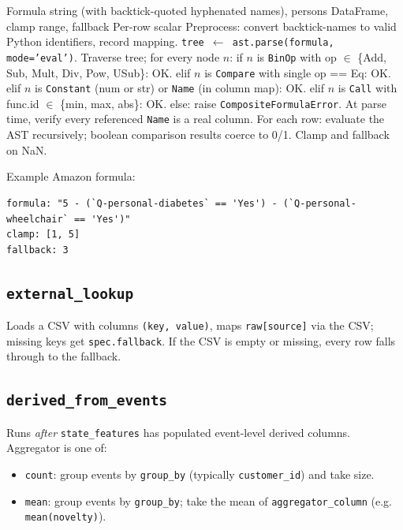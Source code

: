 \documentclass[11pt,a4paper]{article}
\begin{document}
\begin{algorithm}[H]
\caption{Restricted composite-formula evaluator}
\begin{algorithmic}[1]
\Require Formula string (with backtick-quoted hyphenated names), persons DataFrame, clamp range, fallback
\Ensure Per-row scalar
\State Preprocess: convert backtick-names to valid Python identifiers, record mapping.
\State \texttt{tree $\gets$ ast.parse(formula, mode='eval')}.
\State Traverse tree; for every node $n$:
\State \quad if $n$ is \texttt{BinOp} with op $\in$ \{Add, Sub, Mult, Div, Pow, USub\}: OK.
\State \quad elif $n$ is \texttt{Compare} with single op == Eq: OK.
\State \quad elif $n$ is \texttt{Constant} (num or str) or \texttt{Name} (in column map): OK.
\State \quad elif $n$ is \texttt{Call} with func.id $\in$ \{min, max, abs\}: OK.
\State \quad else: raise \texttt{CompositeFormulaError}.
\State At parse time, verify every referenced \texttt{Name} is a real column.
\State For each row: evaluate the AST recursively; boolean comparison results coerce to 0/1.
\State Clamp and fallback on NaN.
\end{algorithmic}
\end{algorithm}

Example Amazon formula:
\begin{lstlisting}
formula: "5 - (`Q-personal-diabetes` == 'Yes') - (`Q-personal-wheelchair` == 'Yes')"
clamp: [1, 5]
fallback: 3
\end{lstlisting}

\subsection{\texttt{external\_lookup}}

Loads a CSV with columns \texttt{(key, value)}, maps
\texttt{raw[source]} via the CSV; missing keys get
\texttt{spec.fallback}. If the CSV is empty or missing, every row
falls through to the fallback.

\subsection{\texttt{derived\_from\_events}}

Runs \emph{after} \texttt{state\_features} has populated event-level
derived columns. Aggregator is one of:

\begin{itemize}
\item \texttt{count}: group events by \texttt{group\_by}
(typically \texttt{customer\_id}) and take size.
\item \texttt{mean}: group events by \texttt{group\_by}; take the
mean of \texttt{aggregator\_column} (e.g.
\texttt{mean(novelty)}).
\end{itemize}
\end{document}
